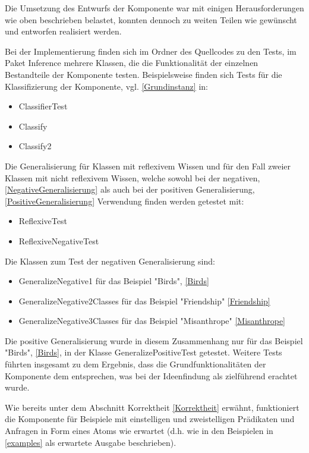 \documentclass[a4paper, 11pt]{book}
\begin{document}
{Die Umsetzung des Entwurfs der Komponente war mit einigen Herausforderungen wie oben beschrieben belastet, konnten dennoch zu weiten Teilen wie gewünscht und entworfen realisiert werden.

 Bei der Implementierung finden sich im Ordner des Quellcodes zu den Tests, im Paket Inference mehrere Klassen, die die Funktionalität der einzelnen Bestandteile der Komponente testen. 
 Beispielsweise finden sich Tests für die Klassifizierung der Komponente, vgl. \ref{Grundinstanz} in:
 \begin{itemize}
 	\item ClassifierTest
 	\item Classify
 	\item Classify2
 \end{itemize}
  Die Generalisierung für Klassen mit reflexivem Wissen und für den Fall zweier Klassen mit nicht reflexivem Wissen, welche sowohl bei der negativen, \ref{NegativeGeneralisierung} als auch bei der positiven Generalisierung, \ref{PositiveGeneralisierung} Verwendung finden werden getestet mit:
  \begin{itemize}
  	\item ReflexiveTest
  	\item ReflexiveNegativeTest
  \end{itemize}

	Die Klassen zum Test der negativen Generalisierung sind:
	\begin{itemize}
		\item GeneralizeNegative1 für das Beispiel "{}Birds"{}, \ref{Birds}
		\item GeneralizeNegative2Classes für das Beispiel "{}Friendship"{}  \ref{Friendship}
		\item GeneralizeNegative3Classes für das Beispiel "{}Misanthrope"{} \ref{Misanthrope}
	\end{itemize}
	 
	 Die positive Generalisierung wurde in diesem Zusammenhang nur für das Beispiel "{}Birds"{},  \ref{Birds}, in der Klasse GeneralizePositiveTest getestet.
	Weitere Tests führten insgesamt zu dem Ergebnis, dass die Grundfunktionalitäten der Komponente dem entsprechen, was bei der Ideenfindung als zielführend erachtet wurde. 
	
	Wie bereits unter dem Abschnitt Korrektheit \ref{Korrektheit} erwähnt, funktioniert die Komponente für Beispiele mit einstelligen und zweistelligen Prädikaten und Anfragen in Form eines Atoms wie erwartet (d.h. wie in den Beispielen in \ref{examples} als erwartete Ausgabe beschrieben). 
	
}
\end{document}
